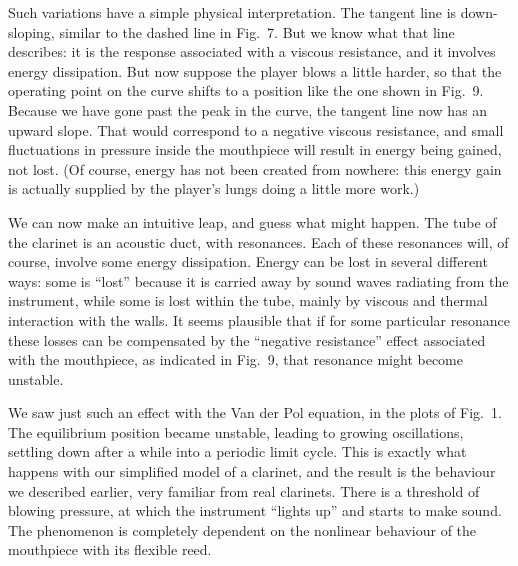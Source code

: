
  Such variations have a simple physical interpretation. The tangent line is 
  down-sloping, similar to the dashed line in Fig.\ 7. But we know what that 
  line describes: it is the response associated with a viscous resistance, and 
  it involves energy dissipation. But now suppose the player blows a little 
  harder, so that the operating point on the curve shifts to a position like 
  the one shown in Fig.\ 9. Because we have gone past the peak in the curve, 
  the tangent line now has an upward slope. That would correspond to a negative 
  viscous resistance, and small fluctuations in pressure inside the mouthpiece 
  will result in energy being gained, not lost. (Of course, energy has not been 
  created from nowhere: this energy gain is actually supplied by the player’s 
  lungs doing a little more work.) 


  We can now make an intuitive leap, and guess what might happen. The tube of 
  the clarinet is an acoustic duct, with resonances. Each of these resonances 
  will, of course, involve some energy dissipation. Energy can be lost in 
  several different ways: some is “lost” because it is carried away by sound 
  waves radiating from the instrument, while some is lost within the tube, 
  mainly by viscous and thermal interaction with the walls. It seems plausible 
  that if for some particular resonance these losses can be compensated by the 
  “negative resistance” effect associated with the mouthpiece, as indicated in 
  Fig.\ 9, that resonance might become unstable. 

  We saw just such an effect with the Van der Pol equation, in the plots of 
  Fig.\ 1. The equilibrium position became unstable, leading to growing 
  oscillations, settling down after a while into a periodic limit cycle. This 
  is exactly what happens with our simplified model of a clarinet, and the 
  result is the behaviour we described earlier, very familiar from real 
  clarinets. There is a threshold of blowing pressure, at which the instrument 
  “lights up” and starts to make sound. The phenomenon is completely dependent 
  on the nonlinear behaviour of the mouthpiece with its flexible reed. 

